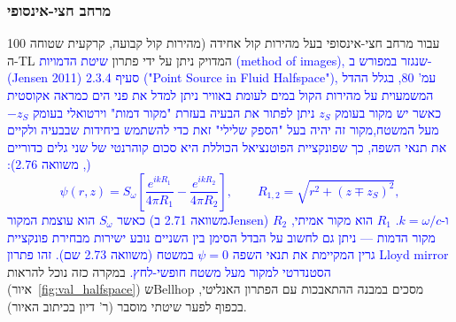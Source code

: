 \documentclass[12pt,a4paper]{article}
\DeclareRobustCommand{\aiedit}[1]{\textcolor{blue}{#1}}
\begin{document}
\subsubsection{מרחב חצי-אינסופי}

עבור מרחב חצי-אינסופי בעל מהירות קול אחידה (מהירות קול קבועה, קרקעית שטוחה 100%
ה-TL המדויק ניתן על ידי פתרון \aiedit{שיטת הדמויות (\textenglish{method of images}), שנגזר
במפורש ב- (Jensen 2011) \cite{jensen2011coac} סעיף 2.3.4 \textenglish {("Point Source in Fluid Halfspace")},
עמ' 80, בגלל ההדל המשמעוית על מהירות הקול במים לעומת באוויר ניתן למדל את פני הים כמראה אקוסטית
כאשר יש מקור בעומק $z_S$ ניתן לפתור את הבעיה בעזרת "מקור דמות" וירטואלי בעומק $-z_S$ מעל המשטח,מקור זה יהיה בעל "הספק שלילי" זאת כדי להשתמש ביחידות שבבעיה ולקיים את תנאי השפה,
כך שפונקציית הפוטנציאל הכוללת היא סכום קוהרנטי של שני גלים כדוריים
(\cite{jensen2011coac}, משוואה 2.76):
\[
  \psi(r,z) = S_\omega\left[\frac{e^{ik R_1}}{4\pi R_1} - \frac{e^{ik R_2}}{4\pi R_2}\right], \qquad
  R_{1,2} = \sqrt{r^2 + (z \mp z_S)^2},
\]
כאשר $S_\omega$ הוא עוצמת המקור (משוואה 2.71 בJensen) ו-$k=\omega/c$.
$R_1$ הוא מקור אמיתי, $R_2$ מקור הדמות  — ניתן גם לחשוב על הבדל הסימן בין השניים נובע ישירות מבחירת
פונקציית גרין המקיימת את תנאי השפה $\psi=0$ במשטח (משוואה 2.73 שם).
זהו פתרון \textenglish{Lloyd mirror} הסטנדרטי למקור מעל משטח חופשי-לחץ.}
במקרה כזה נוכל להראות (איור~\ref{fig:val_halfspace}) ש\textenglish{Bellhop} מסכים במבנה ההתאבכות עם הפתרון האנליטי, בכפוף לפער שיטתי מוסבר (ר' דיון בכיתוב האיור).
\end{document}

